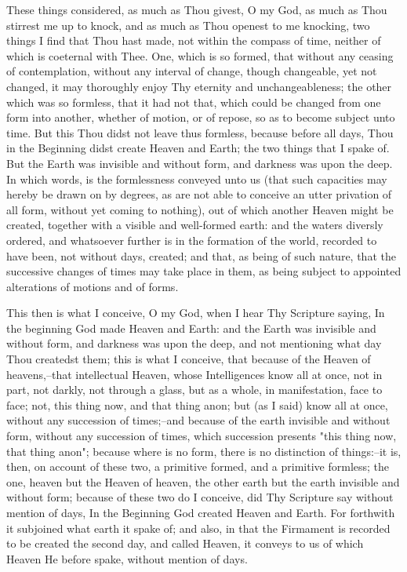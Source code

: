 \documentclass[b5paper,openright,12pt,twoside]{book}
\begin{document}
These things considered, as much as Thou givest, O my God, as much
as Thou stirrest me up to knock, and as much as Thou openest to me
knocking, two things I find that Thou hast made, not within the compass
of time, neither of which is coeternal with Thee. One, which is so
formed, that without any ceasing of contemplation, without any interval
of change, though changeable, yet not changed, it may thoroughly enjoy
Thy eternity and unchangeableness; the other which was so formless,
that it had not that, which could be changed from one form into another,
whether of motion, or of repose, so as to become subject unto time. But
this Thou didst not leave thus formless, because before all days, Thou
in the Beginning didst create Heaven and Earth; the two things that I
spake of. But the Earth was invisible and without form, and darkness
was upon the deep. In which words, is the formlessness conveyed unto us
(that such capacities may hereby be drawn on by degrees, as are not
able to conceive an utter privation of all form, without yet coming to
nothing), out of which another Heaven might be created, together with
a visible and well-formed earth: and the waters diversly ordered, and
whatsoever further is in the formation of the world, recorded to have
been, not without days, created; and that, as being of such nature, that
the successive changes of times may take place in them, as being subject
to appointed alterations of motions and of forms.

This then is what I conceive, O my God, when I hear Thy Scripture
saying, In the beginning God made Heaven and Earth: and the Earth was
invisible and without form, and darkness was upon the deep, and not
mentioning what day Thou createdst them; this is what I conceive, that
because of the Heaven of heavens,--that intellectual Heaven, whose
Intelligences know all at once, not in part, not darkly, not through a
glass, but as a whole, in manifestation, face to face; not, this thing
now, and that thing anon; but (as I said) know all at once, without any
succession of times;--and because of the earth invisible and without
form, without any succession of times, which succession presents "this
thing now, that thing anon"; because where is no form, there is
no distinction of things:--it is, then, on account of these two, a
primitive formed, and a primitive formless; the one, heaven but the
Heaven of heaven, the other earth but the earth invisible and without
form; because of these two do I conceive, did Thy Scripture say without
mention of days, In the Beginning God created Heaven and Earth. For
forthwith it subjoined what earth it spake of; and also, in that the
Firmament is recorded to be created the second day, and called Heaven,
it conveys to us of which Heaven He before spake, without mention of
days.
\end{document}
